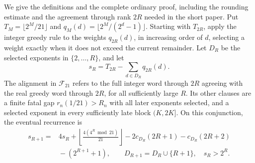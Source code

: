 We give the definitions and the complete ordinary proof, including the
rounding estimate and the agreement through rank $2R$ needed in the
short paper. Put $T_M=\lfloor2^M/21\rfloor$ and
$q_M(d)=\lfloor2^M/(2^d-1)\rfloor$. Starting with $T_{2R}$, apply the
integer greedy rule to the weights $q_{2R}(d)$, in increasing order of
$d$, selecting a weight exactly when it does not exceed the current
remainder. Let $D_R$ be the selected exponents in $\{2,\ldots,R\}$,
and let
\[
 s_R=T_{2R}-\sum_{d\in D_R}q_{2R}(d).
\]
The alignment in $\mathcal F_{21}$ refers to the full integer word
through $2R$ agreeing with the real greedy word through $2R$, for all
sufficiently large $R$. Its other clauses are a finite fatal gap
$r_n(1/21)>R_n$ with all later exponents selected, and a selected
exponent in every sufficiently late block $(K,2K]$.
On this conjunction, the eventual recurrence is
\begin{equation}
 \begin{split}
 s_{R+1}={}&4s_R+
 \left\lfloor\frac{4(4^R\bmod21)}{21}\right\rfloor
 -2c_{D_R}(2R+1)-c_{D_R}(2R+2)\\
 &{}-(2^{R+1}+1),\qquad
 D_{R+1}=D_R\cup\{R+1\},\quad s_R>2^R.
 \end{split}
 \label{eq:record257-twenty-one-recurrence}
\end{equation}

